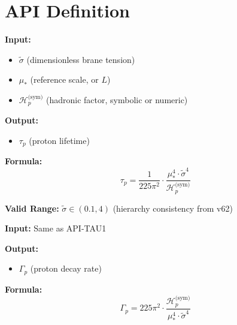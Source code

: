 \documentclass[11pt,a4paper]{article}
\theoremstyle{definition}
\begin{document}
\section{API Definition}
\label{sec:api}

\begin{apibox}
\textbf{Input:}
\begin{itemize}
  \item $\tilde{\sigma}$ (dimensionless brane tension)
  \item $\mu_*$ (reference scale, or $L$)
  \item $\mathcal{H}_p^{\text{(sym)}}$ (hadronic factor, symbolic or numeric)
\end{itemize}

\textbf{Output:}
\begin{itemize}
  \item $\tau_p$ (proton lifetime)
\end{itemize}

\textbf{Formula:}
\begin{equation}
\label{eq:api-tau1}
\tau_p = \frac{1}{225\pi^2} \cdot \frac{\mu_*^4 \cdot \tilde{\sigma}^4}{\mathcal{H}_p^{\text{(sym)}}}
\end{equation}

\textbf{Valid Range:} $\tilde{\sigma} \in (0.1, 4)$ (hierarchy consistency from v62)
\end{apibox}

\begin{apibox}
\textbf{Input:} Same as API-TAU1

\textbf{Output:}
\begin{itemize}
  \item $\Gamma_p$ (proton decay rate)
\end{itemize}

\textbf{Formula:}
\begin{equation}
\label{eq:api-tau2}
\Gamma_p = 225\pi^2 \cdot \frac{\mathcal{H}_p^{\text{(sym)}}}{\mu_*^4 \cdot \tilde{\sigma}^4}
\end{equation}
\end{apibox}

\end{document}
